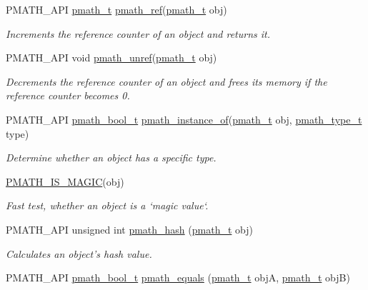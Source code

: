 \begin{CompactItemize}
\item 
PMATH\_\-API \hyperlink{classpmath__t}{pmath\_\-t} \hyperlink{classpmath__t_42cd678b691046a58dede518315c6b13}{pmath\_\-ref}(\hyperlink{classpmath__t}{pmath\_\-t} obj)
\begin{CompactList}\small\item\em Increments the reference counter of an object and returns it. \item\end{CompactList}\item 
PMATH\_\-API void \hyperlink{classpmath__t_54e905402c38940687033b87eb8c6c9f}{pmath\_\-unref}(\hyperlink{classpmath__t}{pmath\_\-t} obj)
\begin{CompactList}\small\item\em Decrements the reference counter of an object and frees its memory if the reference counter becomes 0. \item\end{CompactList}\item 
PMATH\_\-API \hyperlink{group__general__types_gc92090cb0b56345d6c379ed2341d4ef4}{pmath\_\-bool\_\-t} \hyperlink{classpmath__t_0bd527f1ec2db8f1eba58e1fd84babbc}{pmath\_\-instance\_\-of}(\hyperlink{classpmath__t}{pmath\_\-t} obj, \hyperlink{group__objects_ge2646df76dcb0113715322b13a1f36f0}{pmath\_\-type\_\-t} type)
\begin{CompactList}\small\item\em Determine whether an object has a specific type. \item\end{CompactList}\item 
\hyperlink{group__objects_gfa4048bca71f5022d1fb979a5b930a11}{PMATH\_\-IS\_\-MAGIC}(obj)
\begin{CompactList}\small\item\em Fast test, whether an object is a `magic value`. \item\end{CompactList}\item 
PMATH\_\-API unsigned int \hyperlink{group__objects_g9413cfb0b3fd00d361046189853a11d8}{pmath\_\-hash} (\hyperlink{classpmath__t}{pmath\_\-t} obj)
\begin{CompactList}\small\item\em Calculates an object's hash value. \item\end{CompactList}\item 
PMATH\_\-API \hyperlink{group__general__types_gc92090cb0b56345d6c379ed2341d4ef4}{pmath\_\-bool\_\-t} \hyperlink{group__objects_g6475af7f7c85777392e38c570ac07892}{pmath\_\-equals} (\hyperlink{classpmath__t}{pmath\_\-t} objA, \hyperlink{classpmath__t}{pmath\_\-t} objB)

\end{CompactItemize}
